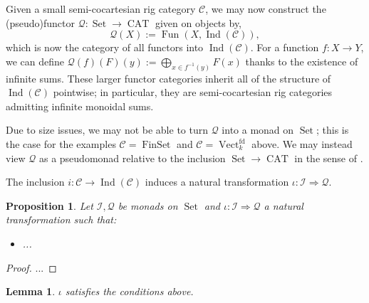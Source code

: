 \documentclass[12pt]{article}
\theoremstyle{plain}
\newtheorem{proposition}[thm]{Proposition}
\newtheorem{lemma}[thm]{Lemma}
\theoremstyle{definition}
\newcommand{\call}[1]{\mathcal{#1}}
\newcommand{\Ccal}{\call{C}}
\newcommand{\Ical}{\call{I}}
\newcommand{\Qcal}{\call{Q}}
\DeclareMathOperator{\set}{Set}
\DeclareMathOperator{\finset}{FinSet}
\DeclareMathOperator{\vect}{Vect}
\DeclareMathOperator{\CAT}{CAT}
\DeclareMathOperator{\ind}{Ind}
\DeclareMathOperator{\Fun}{Fun}
\begin{document}
Given a small semi-cocartesian rig category $\Ccal$, we may now construct the (pseudo)functor $\Qcal: \set \to \CAT$ given on objects by,
\[\Qcal(X) := \Fun(X,\ind(\Ccal)),\]
which is now the category of all functors into $\ind(\Ccal)$. For a function $f:X \to Y$, we can define $\Qcal(f)(F)(y):= \bigoplus_{x \in f^{-1}(y)} F(x)$ thanks to the existence of infinite sums. These larger functor categories inherit all of the structure of $\ind(\Ccal)$ pointwise; in particular, they are semi-cocartesian rig categories admitting infinite monoidal sums.

Due to size issues, we may not be able to turn $\Qcal$ into a monad on $\set$; this is the case for the examples $\Ccal=\finset$ and $\Ccal = \vect^{\mathrm{fd}}_k$ above. We may instead view $\Qcal$ as a pseudomonad relative to the inclusion $\set \to \CAT$ in the sense of \cite{pseudomonad}.

The inclusion $i: \Ccal \to \ind(\Ccal)$ induces a natural transformation $\iota:\Ical \Rightarrow \Qcal$.

\begin{proposition}
Let $\Ical,\Qcal$ be monads on $\set$ and $\iota:\Ical \Rightarrow \Qcal$ a natural transformation such that:
\begin{itemize}
    \item ...
\end{itemize}
\end{proposition}
\begin{proof}
...
\end{proof}

\begin{lemma}
$\iota$ satisfies the conditions above.
\end{lemma}

\appendix
\end{document}
